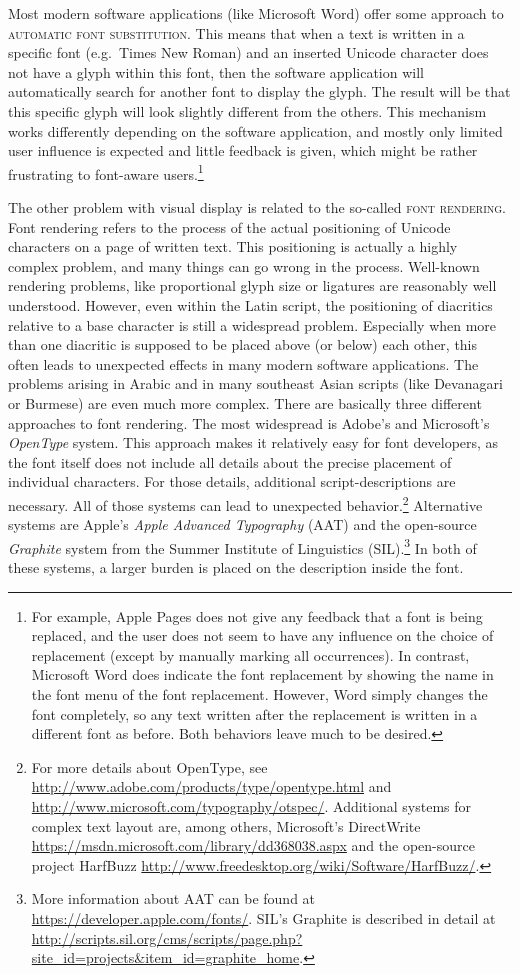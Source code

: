 Most modern software applications (like Microsoft Word) offer some approach to
\textsc{automatic font substitution}. This means that when a text is written in
a specific font (e.g.~Times New Roman) and an inserted Unicode character does not
have a glyph within this font, then the software application will automatically
search for another font to display the glyph. The result will be that this
specific glyph will look slightly different from the others. This mechanism
works differently depending on the software application, and mostly only limited
user influence is expected and little feedback is given, which might be rather
frustrating to font-aware users.\footnote{For example, Apple Pages does not give
any feedback that a font is being replaced, and the user does not seem to have
any influence on the choice of replacement (except by manually marking all
occurrences). In contrast, Microsoft Word does indicate the font replacement by
showing the name in the font menu of the font replacement. However, Word simply
changes the font completely, so any text written after the replacement is written in a
different font as before. Both behaviors leave much to be desired.}

The other problem with visual display is related to the so-called \textsc{font
rendering}. Font rendering refers to the process of the actual positioning of
Unicode characters on a page of written text. This positioning is actually a
highly complex problem, and many things can go wrong in the process. Well-known
rendering problems, like proportional glyph size or ligatures are reasonably
well understood. However, even within the Latin script, the positioning of
diacritics relative to a base character is still a widespread problem.
Especially when more than one diacritic is supposed to be placed above (or
below) each other, this often leads to unexpected effects in many modern
software applications. The problems arising in Arabic and in many southeast
Asian scripts (like Devanagari or Burmese) are even much more complex. There are
basically three different approaches to font rendering. The most widespread is
Adobe's and Microsoft's \emph{OpenType }system. This approach makes it
relatively easy for font developers, as the font itself does not include all
details about the precise placement of individual characters. For those details,
additional script-descriptions are necessary. All of those systems can lead to
unexpected behavior.\footnote{For more details about OpenType, see
\url{http://www.adobe.com/products/type/opentype.html} and
\url{http://www.microsoft.com/typography/otspec/}. Additional systems for
complex text layout are, among others, Microsoft's DirectWrite
\url{https://msdn.microsoft.com/library/dd368038.aspx} and the open-source
project HarfBuzz \url{http://www.freedesktop.org/wiki/Software/HarfBuzz/}.}
Alternative systems are Apple's \emph{Apple Advanced Typography} (AAT) and the
open-source \emph{Graphite} system from the Summer Institute of Linguistics
(SIL).\footnote{More information about AAT can be found at
\url{https://developer.apple.com/fonts/}. SIL's Graphite is described in detail
at
\url{http://scripts.sil.org/cms/scripts/page.php?site\_id=projects\&item\_id=graphite\_home}.}
In both of these systems, a larger burden is placed on the description inside
the font.

